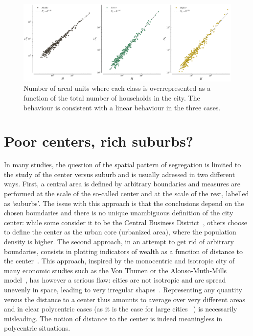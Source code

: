 \begin{figure}
    \centering
    \includegraphics[width=\textwidth]{./gfx/chapter-segregation/number_overrepresented.pdf}
    \caption{Number of areal units where each class is overrepresented as a
    function of the total number of households in the city. The behaviour is
consistent with a linear behaviour in the three cases.
\label{fig:overrepresented}}
\end{figure}


\section{Poor centers, rich suburbs?}
\label{sec:poor_centers_rich_suburbs_}

In many studies, the question of the spatial pattern of segregation is limited
to the study of the center versus suburb and is usually adressed in two
different ways. First, a central area is defined by arbitrary boundaries and
measures are performed at the scale of the so-called center and at the scale of
the  rest, labelled as `suburbs'. The issue with this approach is that the
conclusions depend on the chosen boundaries and there is no unique unambiguous
definition of the city center: while some consider it to be the Central Business
District~\cite{Glaeser:2008}, others choose to define the center as the urban
core (urbanized area), where the population density is higher. The second
approach, in an attempt to get rid of arbitrary boundaries, consists in plotting
indicators of wealth as a function of distance to the
center~\cite{Glaeser:2008}. This approach, inspired by the monocentric and
isotropic city of many economic studies such as the Von Thunen or the
Alonso-Muth-Mills model~\cite{Brueckner:1987}, has however a serious flaw:
cities are not isotropic and are spread unevenly in space, leading to very
irregular shapes~\cite{Makse:1995}. Representing any quantity versus the
distance to a center thus amounts to average over very different areas and in
clear polycentric cases (as it is the case for large cities
~\cite{Louf:2013_polycentric})
is necessarily misleading. The notion of distance to the center is indeed
meaningless in polycentric situations.\\


